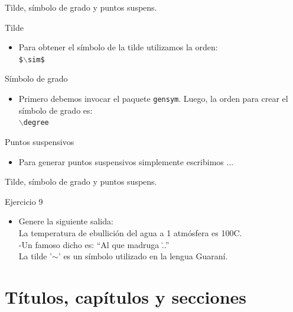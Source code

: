 \documentclass[10pt]{beamer}
\begin{document}
\begin{frame}{Tilde, símbolo de grado y puntos suspens.}
	\begin{block}{Tilde}
		\begin{itemize}
			\item Para obtener el símbolo de la tilde utilizamos la orden: \\
			\texttt{\$$\backslash$sim\$}
		\end{itemize}
	\end{block}	
	\begin{block}{Símbolo de grado}
		\begin{itemize}
			\item Primero debemos invocar el paquete \texttt{gensym}. Luego, la orden para crear el símbolo de grado es: \\
			\texttt{$\backslash$degree}
		\end{itemize}
	\end{block}	
	\begin{block}{Puntos suspensivos}
		\begin{itemize}
			\item Para generar puntos suspensivos simplemente escribimos ...
		\end{itemize}
	\end{block}
\end{frame}

\begin{frame}{Tilde, símbolo de grado y puntos suspens.}
\begin{exampleblock}{Ejercicio 9}
\begin{itemize}
	\item Genere la siguiente salida:\\
	La temperatura de ebullición del agua a 1 atmósfera es 100\degree C. \\
	-Un famoso dicho es: ``Al que madruga \...'' \\
	La tilde '$\sim$' es un símbolo utilizado en la lengua Guaraní.
\end{itemize}
\end{exampleblock}
\end{frame}

\section{Títulos, capítulos y secciones}
\end{document}
